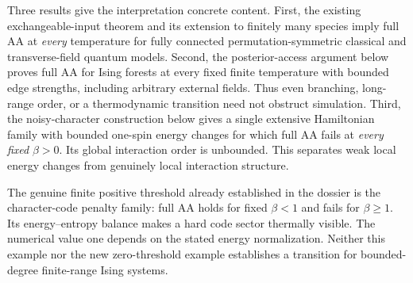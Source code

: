 Three results give the interpretation concrete content. First, the
existing exchangeable-input theorem and its extension to finitely many
species imply full AA at \emph{every} temperature for fully connected
permutation-symmetric classical and transverse-field quantum models.
Second, the posterior-access argument below proves full AA for Ising
forests at every fixed finite temperature with bounded edge strengths,
including arbitrary external fields. Thus even branching, long-range
order, or a thermodynamic transition need not obstruct simulation.
Third, the noisy-character construction below gives a single extensive
Hamiltonian family with bounded one-spin energy changes for which full
AA fails at \emph{every fixed} $\beta>0$. Its global interaction order is
unbounded. This separates weak local energy changes from genuinely local
interaction structure.

The genuine finite positive threshold already established in the dossier
is the character-code penalty family: full AA holds for fixed $\beta<1$
and fails for $\beta\ge1$. Its energy--entropy balance makes a hard code
sector thermally visible. The numerical value one depends on the stated
energy normalization. Neither this example nor the new zero-threshold
example establishes a transition for bounded-degree finite-range Ising
systems.
